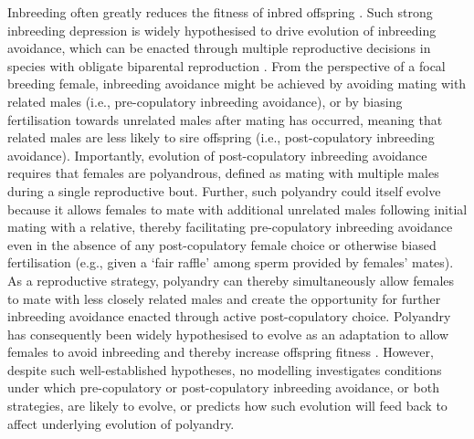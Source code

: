 \documentclass[10pt,letterpaper]{article}
\begin{document}
Inbreeding often greatly reduces the fitness of inbred offspring \cite[termed `inbreeding depression';][]{Charlesworth1999, Keller2002, Charlesworth2009}. Such strong inbreeding depression is widely hypothesised to drive evolution of inbreeding avoidance, which can be enacted through multiple reproductive decisions in species with obligate biparental reproduction \cite[][]{Parker1979, Parker2006, Pusey1996, Szulkin2012}. From the perspective of a focal breeding female, inbreeding avoidance might be achieved by avoiding mating with related males (i.e., pre-copulatory inbreeding avoidance), or by biasing fertilisation towards unrelated males after mating has occurred, meaning that related males are less likely to sire offspring (i.e., post-copulatory inbreeding avoidance). Importantly, evolution of post-copulatory inbreeding avoidance requires that females are polyandrous, defined as mating with multiple males during a single reproductive bout. Further, such polyandry could itself evolve because it allows females to mate with additional unrelated males following initial mating with a relative, thereby facilitating pre-copulatory inbreeding avoidance even in the absence of any post-copulatory female choice or otherwise biased fertilisation (e.g., given a `fair raffle' among sperm provided by females' mates). As a reproductive strategy, polyandry can thereby simultaneously allow females to mate with less closely related males and create the opportunity for further inbreeding avoidance enacted through active post-copulatory choice. Polyandry has consequently been widely hypothesised to evolve as an adaptation to allow females to avoid inbreeding and thereby increase offspring fitness \cite[][]{Zeh1997, Jennions2000, Tregenza2002, Akcay2007}. However, despite such well-established hypotheses, no modelling investigates conditions under which pre-copulatory or post-copulatory inbreeding avoidance, or both strategies, are likely to evolve, or predicts how such evolution will feed back to affect underlying evolution of polyandry.
\end{document}
